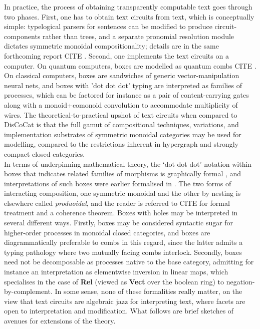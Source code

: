 In practice, the process of obtaining transparently computable text goes through two phases. First, one has to obtain text circuits from text, which is conceptually simple: typelogical parsers for sentences can be modified to produce circuit-components rather than trees, and a separate pronomial resolution module dictates symmetric monoidal compositionality; details are in the same forthcoming report \bR CITE \e. Second, one implements the text circuits on a computer. On quantum computers, boxes are modelled as quantum combs \bR CITE \e. On classical computers, boxes are sandwiches of generic vector-manipulation neural nets, and boxes with 'dot dot dot' typing are interpreted as families of processes, which can be factored for instance as a pair of content-carrying gates along with a monoid+comonoid convolution to accommodate multiplicity of wires. The theoretical-to-practical upshot of text circuits when compared to DisCoCat is that the full gamut of compositional techniques, variations, and implementation substrates of symmetric monoidal categories may be used for modelling, compared to the restrictions inherent in hypergraph and strongly compact closed categories.\\

In terms of underpinning mathematical theory, the `dot dot dot' notation within boxes that indicates related families of morphisms is graphically formal \citep{wilson_string_2022}, and interpretations of such boxes were earlier formalised in \citep{merry_reasoning_2014,quick_-logic_2015,zamdzhiev_rewriting_2017}. The two forms of interacting composition, one symmetric monoidal and the other by nesting is elsewhere called \emph{produoidal}, and the reader is referred to \bR CITE \e for formal treatment and a coherence theorem. Boxes with holes may be interpreted in several different ways. Firstly, boxes may be considered syntactic sugar for higher-order processes in monoidal closed categories, and boxes are diagrammatically preferable to combs in this regard, since the latter admits a typing pathology where two mutually facing combs interlock. Secondly, boxes need not be decomposable as processes native to the base category, admitting for instance an interpretation as elementwise inversion in linear maps, which specialises in the case of \textbf{Rel} (viewed as \textbf{Vect} over the boolean ring) to negation-by-complement. In some sense, none of these formalities really matter, on the view that text circuits are algebraic jazz for interpreting text, where facets are open to interpretation and modification. What follows are brief sketches of avenues for extensions of the theory.

